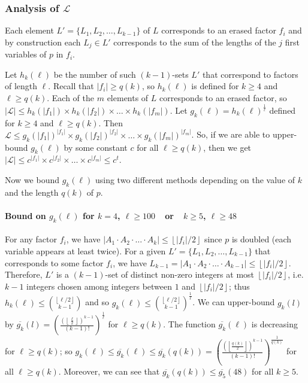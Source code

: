 \documentclass[]{elsart}
\def\floor#1{\left\lfloor #1 \right\rfloor}
\newcommand{\set}[1]{\{#1\}}
\begin{document}
\subsubsection{Analysis of $\mathcal{L}$}

Each element $L'=\set{L_1,L_2,\ldots,L_{k-1}}$ of $L$ corresponds to
an erased factor $f_i$ and by construction each $L_j\in L'$ corresponds to the
sum of the lengths of the $j$ first variables of $p$ in $f_i$.

Let $h_k(\ell)$ be the number of such $(k-1)$-sets $L'$ that
correspond to factors of length $\ell$. Recall that $|f_i|\ge q(k)$,
so $h_k(\ell)$ is defined for $k\ge 4$ and $\ell\ge q(k)$.  Each of
the $m$ elements of $L$ corresponds to an erased factor, so
$|\mathcal{L}|\le h_k(|f_1|)\times h_k(|f_2|)\times\ldots\times
h_k(|f_m|)$.  Let $g_k(\ell)=h_k(\ell)^\frac{1}{\ell}$ defined for
$k\ge 4$ and $\ell\ge q(k)$.  Then $\mathcal{L}\le
g_k(|f_1|)^{|f_1|}\times g_k(|f_2|)^{|f_2|}\times \ldots\times
g_k(|f_m|)^{|f_m|}$. So, if we are able to upper-bound $g_k(\ell)$ by
some constant $c$ for all $\ell\ge q(k)$, then we get
$|\mathcal{L}|\le c^{|f_1|}\times c^{|f_2|}\times\ldots\times
c^{|f_m|}\le c^t$.

Now we bound $g_k(\ell)$ using two different methods
depending on the value of $k$ and the length $q(k)$ of $p$. 

\paragraph{Bound on $g_k(\ell)$ for $k=4$, $\ell\ge 100$\ \ or\ \ $k\ge 5$,
 $\ell\ge48$}\label{par:l1}

For any factor $f_i$, we have $|A_1\cdot A_2\cdot\ldots\cdot A_k|\le
\floor{|f_i|/2}$ since $p$ is doubled (each variable appears at least
twice). For a given $L'=\set{L_1,L_2,\ldots,L_{k-1}}$ that corresponds
to some factor $f_i$, we have $L_{k-1} = |A_1\cdot A_2\cdot\ldots\cdot
A_{k-1}|\le \floor{|f_i|/2}$. Therefore, $L'$ is a $(k-1)$-set of
distinct non-zero integers at most $\floor{|f_i|/2}$, i.e. $k-1$
integers chosen among integers between $1$ and $\floor{|f_i|/2}$; thus
$h_k(\ell)\le {\floor{\ell/2} \choose k-1}$ and so $g_k(\ell)\le
{\floor{\ell/2} \choose k-1}^{\frac{1}{\ell}}$.  We can upper-bound
$g_k(l)$ by $\overline{g_k}(l) =
\left(\frac{\left(\floor{\frac{\ell}{2}}\right)^{k-1}}{(k-1)!}\right)^{\frac{1}{\ell}}$
for $\ell\ge q(k)$. The function $\overline{g_k}(\ell)$ is decreasing
for $\ell\ge q(k)$; so $g_k(\ell)\le\overline{g_k}(\ell)\le
\overline{g_k}(q(k)) =
\left(\frac{\left(\floor{\frac{q(k)}{2}}\right)^{k-1}}{(k-1)!}\right)^{\frac{1}{q(k)}}$
for all $\ell\ge q(k)$. Moreover, we can see that
$\overline{g_{k}}(q(k))\le \overline{g_5}(48)$ for all $k\ge 5$.
\end{document}
